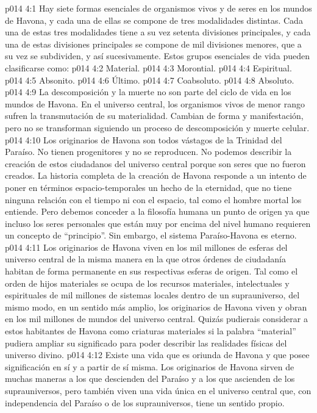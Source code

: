 \vs p014 4:1 Hay siete formas esenciales de organismos vivos y de seres en los mundos de Havona, y cada una de ellas se compone de tres modalidades distintas. Cada una de estas tres modalidades tiene a su vez setenta divisiones principales, y cada una de estas divisiones principales se compone de mil divisiones menores, que a su vez se subdividen, y así sucesivamente. Estos grupos esenciales de vida pueden clasificarse como:
\vs p014 4:2 Material.
\vs p014 4:3 Morontial.
\vs p014 4:4 Espiritual.
\vs p014 4:5 Absonito.
\vs p014 4:6 Último.
\vs p014 4:7 Coabsoluto.
\vs p014 4:8 Absoluto.
\vs p014 4:9 \pc La descomposición y la muerte no son parte del ciclo de vida en los mundos de Havona. En el universo central, los organismos vivos de menor rango sufren la transmutación de su materialidad. Cambian de forma y manifestación, pero no se transforman siguiendo un proceso de descomposición y muerte celular.
\vs p014 4:10 \pc Los originarios de Havona son todos vástagos de la Trinidad del Paraíso. No tienen progenitores y no se reproducen. No podemos describir la creación de estos ciudadanos del universo central porque son seres que no fueron creados. La historia completa de la creación de Havona responde a un intento de poner en términos espacio\hyp{}temporales un hecho de la eternidad, que no tiene ninguna relación con el tiempo ni con el espacio, tal como el hombre mortal los entiende. Pero debemos conceder a la filosofía humana un punto de origen ya que incluso los seres personales que están muy por encima del nivel humano requieren un concepto de “principio”. Sin embargo, el sistema Paraíso\hyp{}Havona es eterno.
\vs p014 4:11 Los originarios de Havona viven en los mil millones de esferas del universo central de la misma manera en la que otros órdenes de ciudadanía habitan de forma permanente en sus respectivas esferas de origen. Tal como el orden de hijos materiales se ocupa de los recursos materiales, intelectuales y espirituales de mil millones de sistemas locales dentro de un suprauniverso, del mismo modo, en un sentido más amplio, los originarios de Havona viven y obran en los mil millones de mundos del universo central. Quizás pudierais considerar a estos habitantes de Havona como criaturas materiales si la palabra “material” pudiera ampliar su significado para poder describir las realidades físicas del universo divino.
\vs p014 4:12 Existe una vida que es oriunda de Havona y que posee significación en sí y a partir de sí misma. Los originarios de Havona sirven de muchas maneras a los que descienden del Paraíso y a los que ascienden de los suprauniversos, pero también viven una vida única en el universo central que, con independencia del Paraíso o de los suprauniversos, tiene un sentido propio.
